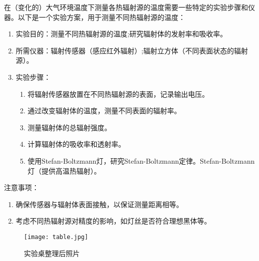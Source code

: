 \documentclass[dvipsnames, svgnames,a4paper,11pt]{article}
\begin{document}
	在（变化的）大气环境温度下测量各热辐射源的温度需要一些特定的实验步骤和仪器。以下是一个实验方案，用于测量不同热辐射源的温度：
	
	\begin{enumerate}
		\item 实验目的：测量不同热辐射源的温度;研究辐射体的发射率和吸收率。
		\item 所需仪器：辐射传感器（感应红外辐射）;辐射立方体（不同表面状态的辐射源）。
		\item 实验步骤： 
			\begin{enumerate}
				\item 将辐射传感器放置在不同热辐射源的表面，记录输出电压。
				\item 通过改变辐射体的温度，测量不同表面的辐射率。
				\item 测量辐射体的总辐射强度。 
				\item 计算辐射体的吸收率和透射率。 
				\item 使用Stefan-Boltzmann灯，研究Stefan-Boltzmann定律。Stefan-Boltzmann灯（提供高温热辐射）。
			\end{enumerate}
	\end{enumerate}
	
	注意事项：
	\begin{enumerate}
		\item 确保传感器与辐射体表面接触，以保证测量距离相等。
		\item 考虑不同热辐射源对精度的影响，如灯丝是否符合理想黑体等。
	\end{enumerate}
	





\begin{figure}[htbp]
	\centering
	\texttt{[image: table.jpg]}
	\caption{实验桌整理后照片}
\end{figure}
	
\end{document}
